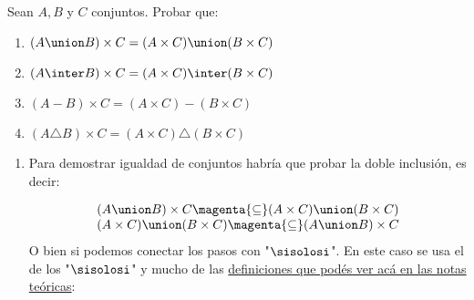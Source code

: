 \begin{enunciado}{\ejercicio}
  Sean $A, B$ y $C$ conjuntos. Probar que:
  \begin{enumerate}[label=\roman*)]
    \item $(A \union B) \times C = (A \times C) \union (B \times C)$
    \item $(A \inter B) \times C = (A \times C) \inter (B \times C)$
    \item $(A - B) \times C = (A \times C) - (B \times C)$
    \item $(A \triangle B) \times C = (A \times C) \triangle (B \times C)$
  \end{enumerate}
\end{enunciado}

\begin{enumerate}[label=\roman*)]
  \item
        Para demostrar igualdad de conjuntos habría que probar la doble inclusión, es decir:

        $$
          \begin{array}{l}
            (A \union B) \times C \magenta{\subseteq} (A \times C) \union (B \times C) \\
            (A \times C) \union (B \times C) \magenta{\subseteq} (A \union B) \times C
          \end{array}
        $$
        O bien si podemos conectar los pasos con "$\sisolosi$". En este caso se usa el de los "$\sisolosi$" y mucho
        de las \hyperlink{teoria-1:basicos-conjuntos}{definiciones que podés ver acá en las notas teóricas}:


\end{enumerate}
